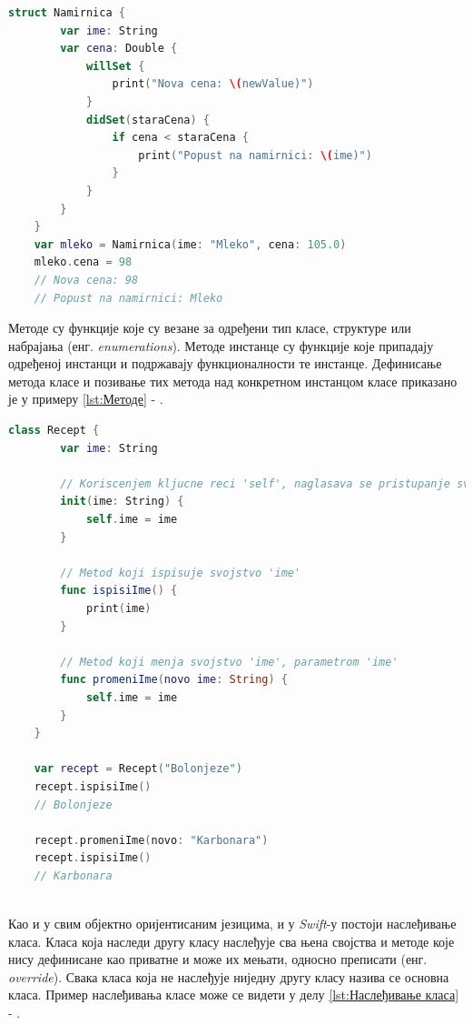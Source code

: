 \documentclass[12pt,oneside]{memoir}
\begin{document}
\begin{lstlisting}[caption=\textit{{Посматрачи својства}}, label={lst:Посматрачи својства}, language=Swift, frame=single]
    struct Namirnica {
        var ime: String
        var cena: Double {
            willSet {
                print("Nova cena: \(newValue)")
            }
            didSet(staraCena) {
                if cena < staraCena {
                    print("Popust na namirnici: \(ime)")
                }
            }
        }
    }
    var mleko = Namirnica(ime: "Mleko", cena: 105.0)
    mleko.cena = 98
    // Nova cena: 98
    // Popust na namirnici: Mleko
\end{lstlisting}

\indent Методе су функције које су везане за одређени тип класе, структуре или набрајања (енг. \textit{enumerations}). Методе инстанце су функције које припадају одређеној инстанци и подржавају функционалности те инстанце. Дефинисање метода класе и позивање тих метода над конкретном инстанцом класе приказано је у примеру \ref{lst:Методе} - .

\begin{lstlisting}[caption=\textit{{Методе}}, label={lst:Методе}, language=Swift, frame=single]
    class Recept {
        var ime: String
        
        // Koriscenjem kljucne reci 'self', naglasava se pristupanje svojstvu/metodi klase
        init(ime: String) {
            self.ime = ime
        }
        
        // Metod koji ispisuje svojstvo 'ime'
        func ispisiIme() {
            print(ime)
        }
        
        // Metod koji menja svojstvo 'ime', parametrom 'ime'
        func promeniIme(novo ime: String) {
            self.ime = ime
        }
    }
    
    var recept = Recept("Bolonjeze")
    recept.ispisiIme()
    // Bolonjeze
    
    recept.promeniIme(novo: "Karbonara")
    recept.ispisiIme()
    // Karbonara
    
\end{lstlisting}

\indent Као и у свим објектно оријентисаним језицима, и у \textit{Swift}-у постоји наслеђивање класа. Класа која наследи другу класу наслеђује сва њена својства и методе које нису дефинисане као приватне и може их мењати, односно преписати (енг. \textit{override}). Свака класа која не наслеђује ниједну другу класу назива се основна класа. Пример наслеђивања класе може се видети у делу \ref{lst:Наслеђивање класа} - .
\end{document}
